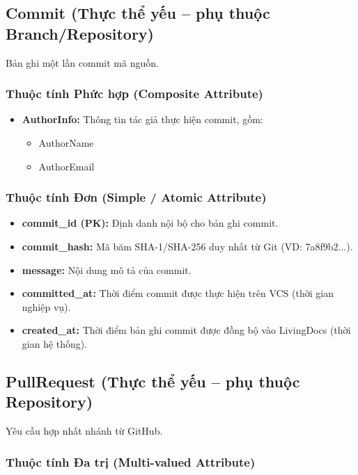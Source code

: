 \subsection{Commit (Thực thể yếu -- phụ thuộc Branch/Repository)}

Bản ghi một lần commit mã nguồn.

\subsubsection{Thuộc tính Phức hợp (Composite Attribute)}

\begin{itemize}
    \item \textbf{AuthorInfo:} Thông tin tác giả thực hiện commit, gồm:
    \begin{itemize}
        \item AuthorName
        \item AuthorEmail
    \end{itemize}
\end{itemize}

\subsubsection{Thuộc tính Đơn (Simple / Atomic Attribute)}

\begin{itemize}
    \item \textbf{commit\_id (PK):} Định danh nội bộ cho bản ghi commit.
    \item \textbf{commit\_hash:} Mã băm SHA-1/SHA-256 duy nhất từ Git (VD: 7a8f9b2...).
    \item \textbf{message:} Nội dung mô tả của commit.
    \item \textbf{committed\_at:} Thời điểm commit được thực hiện trên VCS (thời gian nghiệp vụ).
    \item \textbf{created\_at:} Thời điểm bản ghi commit được đồng bộ vào LivingDocs (thời gian hệ thống).
\end{itemize}


\subsection{PullRequest (Thực thể yếu -- phụ thuộc Repository)}

Yêu cầu hợp nhất nhánh từ GitHub.

\subsubsection{Thuộc tính Đa trị (Multi-valued Attribute)}

